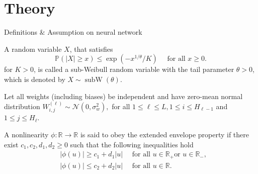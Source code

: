 \documentclass[10pt, handout, envcountsect]{beamer} %
\begin{document}
\section{Theory}
\begin{frame}{Definitions $\&$ Assumption on neural network}

\begin{definition}
A random variable $X$, that satisfies
$$
\mathbb{P}(|X| \geq x) \leq \exp \left(-x^{1 / \theta} / K\right) \quad \text { for all } x \geq 0 .
$$
for $K>0$, is called a sub-Weibull random variable with the tail parameter $\theta>0$, which is denoted by $X \sim \operatorname{subW}(\theta)$.

\end{definition}

Let all weights (including biases) be independent and have zero-mean normal distribution
$
W_{i, j}^{(\ell)} \sim \mathcal{N}\left(0, \sigma_w^2\right),
$
for all $1 \leq \ell \leq L, 1 \leq i \leq H_{\ell-1}$ and $1 \leq j \leq H_{\ell}$.

\begin{definition}
A nonlinearity $\phi: \mathbb{R} \rightarrow \mathbb{R}$ is said to obey the extended envelope property if there exist $c_1, c_2, d_1, d_2 \geq 0$ such that the following inequalities hold
$$
\begin{aligned}
& |\phi(u)| \geq c_1+d_1|u| \quad \text { for all } u \in \mathbb{R}_{+} \text {or } u \in \mathbb{R}_{-}, \\
& |\phi(u)| \leq c_2+d_2|u| \quad \text { for all } u \in \mathbb{R} .
\end{aligned}
$$

\end{definition}
    
\end{frame}

\end{document}

